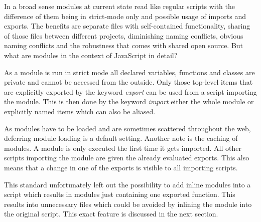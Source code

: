 In a broad sense modules at current state read like regular scripts with the difference of them being in strict-mode only and possible usage of imports and exports. The benefits are separate files with self-contained functionality, sharing of those files between different projects, diminishing naming conflicts, obvious naming conflicts and the robustness that comes with shared open source. But what are modules in the context of JavaScript in detail?

As a module is run in strict mode all declared variables, functions and classes are private and cannot be accessed from the outside. Only those top-level items that are explicitly exported by the keyword \emph{export} can be used from a script importing the module. This is then done by the keyword \emph{import} either the whole module or explicitly named items which can also be aliased.

As modules have to be loaded and are sometimes scattered throughout the web, deferring module loading is a default setting. Another note is the caching of modules. A module is only executed the first time it gets imported. All other scripts importing the module are given the already evaluated exports. This also means that a change in one of the exports is visible to all importing scripts.

This standard unfortunately left out the possibility to add inline modules into a script which results in modules just containing one exported function. This results into unnecessary files which could be avoided by inlining the module into the original script. This exact feature is discussed in the next section.

